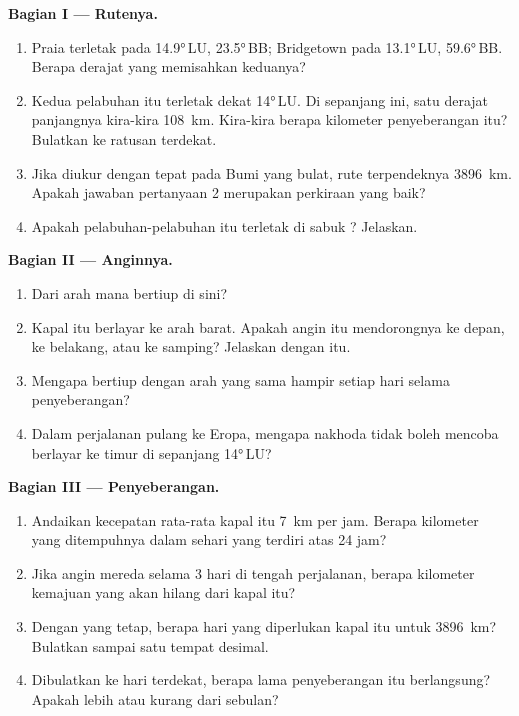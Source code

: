 \begin{problem}
\noindent\textbf{Bagian I --- Rutenya.}\par\nopagebreak
\begin{enumerate}[beginpenalty=10000]
  \item Praia terletak pada \ang{14.9}\,LU, \ang{23.5}\,BB; Bridgetown pada
        \ang{13.1}\,LU, \ang{59.6}\,BB. Berapa derajat  yang
        memisahkan keduanya?
  \item Kedua pelabuhan itu terletak dekat \ang{14}\,LU. Di sepanjang
         ini, satu derajat  panjangnya kira-kira \qty{108}{km}.
        Kira-kira berapa kilometer penyeberangan itu? Bulatkan ke ratusan
        terdekat.
  \item Jika diukur dengan tepat pada Bumi yang bulat, rute terpendeknya
        \qty{3896}{km}. Apakah jawaban pertanyaan 2 merupakan perkiraan
        yang baik?
  \item Apakah pelabuhan-pelabuhan itu terletak di sabuk ?
        Jelaskan.
\end{enumerate}

\noindent\textbf{Bagian II --- Anginnya.}\par\nopagebreak
\begin{enumerate}[resume, beginpenalty=10000]
  \item Dari arah mana  bertiup di sini?
  \item Kapal itu berlayar ke arah barat. Apakah angin itu mendorongnya ke
        depan, ke belakang, atau ke samping? Jelaskan dengan  itu.
  \item Mengapa  bertiup dengan arah yang sama hampir setiap
        hari selama penyeberangan?
  \item Dalam perjalanan pulang ke Eropa, mengapa nakhoda tidak boleh
        mencoba berlayar ke timur di sepanjang \ang{14}\,LU?
\end{enumerate}

\noindent\textbf{Bagian III --- Penyeberangan.}\par\nopagebreak
\begin{enumerate}[resume, beginpenalty=10000]
  \item Andaikan kecepatan rata-rata kapal itu \qty{7}{km} per jam. Berapa
        kilometer yang ditempuhnya dalam sehari yang terdiri atas 24 jam?
  \item Jika angin mereda selama 3 hari di tengah perjalanan, berapa
        kilometer kemajuan yang akan hilang dari kapal itu?
  \item Dengan  yang tetap, berapa hari yang diperlukan kapal
        itu untuk \qty{3896}{km}? Bulatkan sampai satu tempat desimal.
  \item Dibulatkan ke hari terdekat, berapa lama penyeberangan itu
        berlangsung? Apakah lebih atau kurang dari sebulan?
\end{enumerate}
\end{problem}
